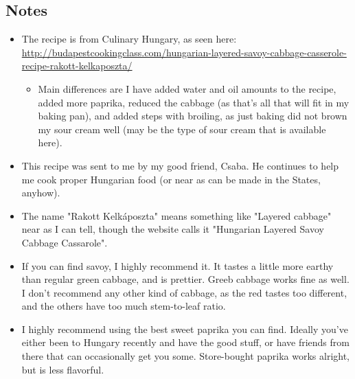 \begin{multicols}{2}
\subsection*{Notes}
\begin{itemize}
    \item The recipe is from Culinary Hungary, as seen here: \url{http://budapestcookingclass.com/hungarian-layered-savoy-cabbage-casserole-recipe-rakott-kelkaposzta/}
    \begin{itemize}
        \item Main differences are I have added water and oil amounts to the recipe, added more paprika, reduced the cabbage (as that's all that will fit in my baking pan), and added steps with broiling, as just baking did not brown my sour cream well (may be the type of sour cream that is available here).
    \end{itemize}
    \item This recipe was sent to me by my good friend, Csaba. He continues to help me cook proper Hungarian food (or near as can be made in the States, anyhow).
    \item The name "Rakott Kelkáposzta" means something like "Layered cabbage" near as I can tell, though the website calls it "Hungarian Layered Savoy Cabbage Cassarole".
    \item If you can find savoy, I highly recommend it. It tastes a little more earthy than regular green cabbage, and is prettier. Greeb cabbage works fine as well. I don't recommend any other kind of cabbage, as the red tastes too different, and the others have too much stem-to-leaf ratio.
    \item I highly recommend using the best sweet paprika you can find. Ideally you've either been to Hungary recently and have the good stuff, or have friends from there that can occasionally get you some. Store-bought paprika works alright, but is less flavorful.
\end{itemize}
\end{multicols}
\clearpage